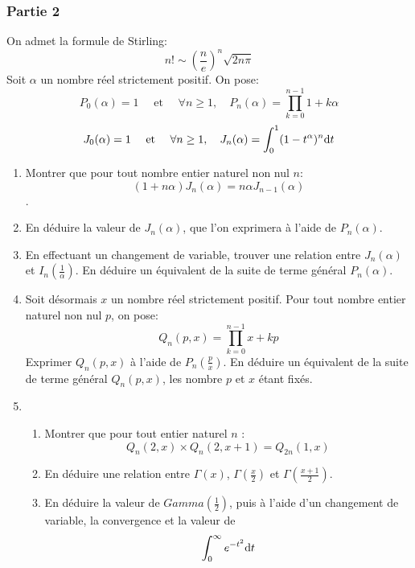 \documentclass{article}
\def \de {{\rm d}}
\begin{document}
\subsubsection*{Partie 2}
On admet la formule de Stirling:
\[n!\sim \left(\frac ne\right)^n\sqrt{2n\pi}\]
Soit $\alpha$ un nombre réel strictement positif. On pose:
\[P_0(\alpha)=1\quad\mbox{ et }\quad \forall n\geq 1,\quad P_n(\alpha)=\prod_{k=0}^{n-1}1+k\alpha\]
\[J_0(\alpha)=1\quad\mbox{ et }\quad \forall n\geq 1,\quad J_n(\alpha)=\int_{0}^{1}(1-t^\alpha)^n\de t\]
\begin{enumerate}
\item Montrer que pour tout nombre entier naturel non nul $n$: 
\[(1+n\alpha)J_n(\alpha)= n\alpha J_{n-1}(\alpha)\].
\item En déduire la valeur de $J_n(\alpha)$, que l'on exprimera à l'aide de $P_n(\alpha)$.
\item En effectuant un changement de variable, trouver une relation entre $J_n(\alpha)$ et $I_n(\frac 1{\alpha})$. En déduire un équivalent de la suite de terme général $P_n(\alpha)$.
\item Soit désormais $x$ un nombre réel strictement positif. Pour tout nombre entier naturel non nul $p$, on pose:
\[Q_n(p,x)=\prod_{k=0}^{n-1}x+kp\]
Exprimer $Q_n(p,x)$ à l'aide de $P_n(\frac px)$. En déduire un équivalent de la suite de terme général $Q_n(p,x)$, les nombre $p$ et $x$ étant fixés.
\item \begin{enumerate}
\item Montrer que pour tout entier naturel $n$ : 
\[Q_n(2,x)\times  Q_n(2,x+1) =Q_{2n}(1,x)\]
\item En déduire une relation entre $\Gamma(x)$, $\Gamma(\frac x2)$ et $\Gamma(\frac {x+1}2)$.
\item En déduire la valeur de $Gamma(\frac 12)$, puis à l'aide d'un changement de variable, la convergence et la valeur de 
\[\int_0^\infty e^{-t^2}\de t\]
\end{enumerate}
\end{enumerate}
  
\end{document}
